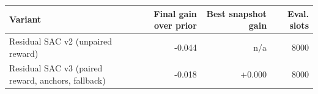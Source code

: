 \begin{tabular}{lrrr}
\toprule
Variant & Final gain over prior & Best snapshot gain & Eval. slots \\
\midrule
Residual SAC v2 (unpaired reward) & -0.044 & n/a & 8000 \\
Residual SAC v3 (paired reward, anchors, fallback) & -0.018 & +0.000 & 8000 \\
\bottomrule
\end{tabular}
